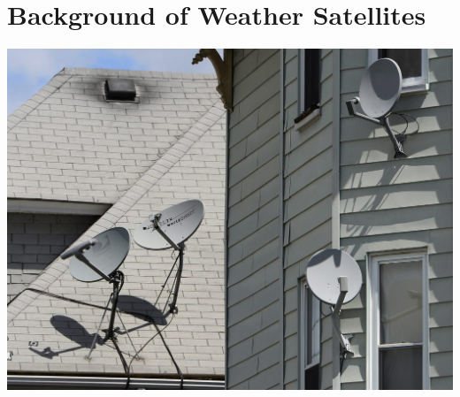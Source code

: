 \documentclass[]{beamer}
\begin{document}
\section[Background]{Background of Weather Satellites}
\begin{frame}
    \includegraphics[]{images/dish.jpg}
\end{frame}
\end{document}
